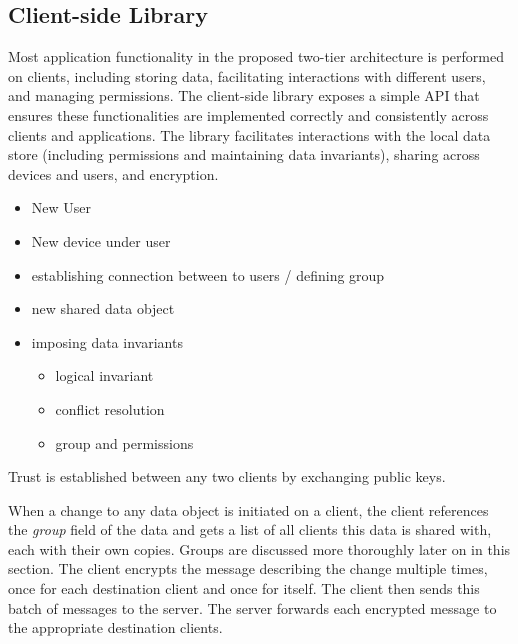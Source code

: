 
\subsection{Client-side Library}



Most application functionality in the proposed two-tier architecture is performed on clients, including storing data, facilitating interactions with different users, and managing permissions. The \name{} client-side library exposes a simple API that ensures these functionalities are implemented correctly and consistently across clients and applications. The library facilitates interactions with the local data store (including permissions and maintaining data invariants), sharing across devices and users, and encryption.  

\begin{itemize}
    \item New User
    \item New device under user
    \item establishing connection between to users / defining group
    \item new shared data object
    \item imposing data invariants
        \begin{itemize}
            \item logical invariant
            \item conflict resolution
            \item group and permissions
        \end{itemize}
\end{itemize}

Trust is established between any two clients by exchanging public keys. 

When a change to any data object is initiated on a client, the client references the \textit{group} field of the data and gets a list of all clients this data is shared with, each with their own copies. Groups are discussed more thoroughly later on in this section. The client encrypts the message describing the change multiple times, once for each destination client and once for itself. The client then sends this batch of messages to the server. The server forwards each encrypted message to the appropriate destination clients. 

